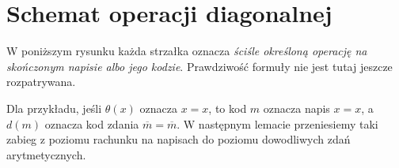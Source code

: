 
\section{Schemat operacji diagonalnej}
W poniższym rysunku każda strzałka oznacza
\emph{ściśle określoną operację na skończonym napisie albo jego kodzie}.
Prawdziwość formuły nie jest tutaj jeszcze rozpatrywana.

\begin{center}
\end{center}

Dla przykładu, jeśli $\theta(x)$ oznacza $x=x$, to kod $m$
oznacza napis $x=x$, a $d(m)$ oznacza kod zdania
$\overline m=\overline m$. W następnym lemacie
przeniesiemy taki zabieg z poziomu rachunku na napisach
do poziomu dowodliwych zdań arytmetycznych.

